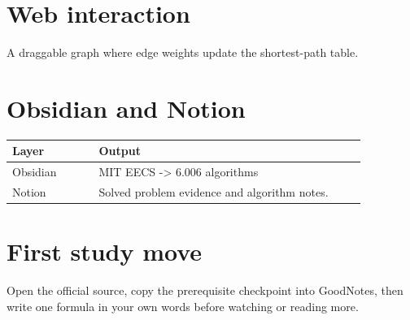 \documentclass[11pt]{article}
\begin{document}
\section*{Web interaction}
A draggable graph where edge weights update the shortest-path table.

\section*{Obsidian and Notion}
\begin{tabular}{p{0.22\linewidth}p{0.68\linewidth}}
\toprule
Layer & Output \\
\midrule
Obsidian & MIT EECS -> 6.006 algorithms \\
Notion & Solved problem evidence and algorithm notes. \\
\bottomrule
\end{tabular}

\section*{First study move}
Open the official source, copy the prerequisite checkpoint into GoodNotes, then write one formula in your own words before watching or reading more.
\end{document}

